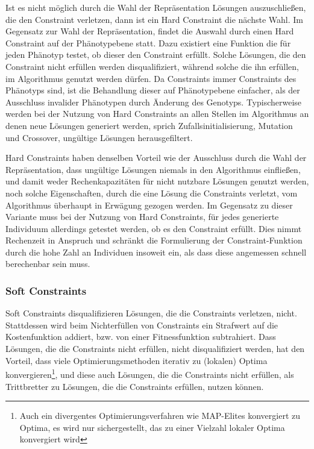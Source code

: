 Ist es nicht möglich durch die Wahl der Repräsentation Lösungen auszuschließen, die den Constraint verletzen, dann ist ein Hard Constraint die nächste Wahl.
Im Gegensatz zur Wahl der Repräsentation, findet die Auswahl durch einen Hard Constraint auf der Phänotypebene statt.
Dazu existiert eine Funktion die für jeden Phänotyp testet, ob dieser den Constraint erfüllt.
Solche Lösungen, die den Constraint nicht erfüllen werden disqualifiziert, während solche die ihn erfüllen, im Algorithmus genutzt werden dürfen.
Da Constraints immer Constraints des Phänotyps sind, ist die Behandlung dieser auf Phänotypebene einfacher, als der Ausschluss invalider Phänotypen durch Änderung des Genotyps.
Typischerweise werden bei der Nutzung von Hard Constraints an allen Stellen im Algorithmus an denen neue Lösungen generiert werden, sprich Zufallsinitialisierung, Mutation und Crossover, ungültige Lösungen herausgefiltert.

Hard Constraints haben denselben Vorteil wie der Ausschluss durch die Wahl der Repräsentation, dass ungültige Lösungen niemals in den Algorithmus einfließen, und damit weder Rechenkapazitäten für nicht nutzbare Lösungen genutzt werden, noch solche Eigenschaften, durch die eine Lösung die Constraints verletzt, vom Algorithmus überhaupt in Erwägung gezogen werden.
Im Gegensatz zu dieser Variante muss bei der Nutzung von Hard Constraints, für jedes generierte Individuum allerdings getestet werden, ob es den Constraint erfüllt.
Dies nimmt Rechenzeit in Anspruch und schränkt die Formulierung der Constraint-Funktion durch die hohe Zahl an Individuen insoweit ein, als dass diese angemessen schnell berechenbar sein muss.



\subsubsection{Soft Constraints}
Soft Constraints disqualifizieren Lösungen, die die Constraints verletzen, nicht.
Stattdessen wird beim Nichterfüllen von Constraints ein Strafwert auf die Kostenfunktion addiert, bzw. von einer Fitnessfunktion subtrahiert.
Dass Lösungen, die die Constraints nicht erfüllen, nicht disqualifiziert werden, hat den Vorteil, dass viele Optimierungsmethoden iterativ zu (lokalen) Optima konvergieren\footnote{Auch ein divergentes Optimierungsverfahren wie MAP-Elites konvergiert zu Optima, es wird nur sichergestellt, das zu einer Vielzahl lokaler Optima konvergiert wird}, 
und diese auch Lösungen, die die Constraints nicht erfüllen, als Trittbretter zu Lösungen, die die Constraints erfüllen, nutzen können.

